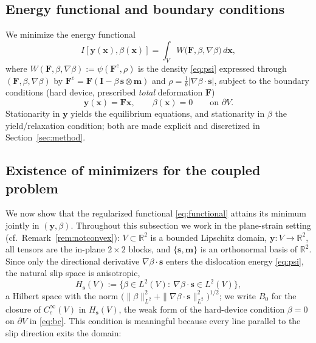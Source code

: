 \documentclass[12pt]{article}
\theoremstyle{plain}
\theoremstyle{definition}
\newcommand{\bF}{\bm{F}}
\newcommand{\bs}{\bm{s}}
\newcommand{\bmm}{\bm{m}}
\newcommand{\by}{\bm{y}}
\newcommand{\bx}{\bm{x}}
\newcommand{\bI}{\bm{I}}
\newcommand{\Fe}{\bF^{e}}
\newcommand{\R}{\mathbb{R}}
\begin{document}
\subsection{Energy functional and boundary conditions}\label{sec:variational}
We minimize the energy functional
\begin{equation}\label{eq:functional}
  I[\by(\bx),\beta(\bx)]=\int_{V} W\bigl(\bF,\beta,\nabla\beta\bigr)\,d\bx ,
\end{equation}
where $W(\bF,\beta,\nabla\beta):=\psi(\Fe,\rho)$ is the density \eqref{eq:psi}
expressed through $(\bF,\beta,\nabla\beta)$ by
$\Fe=\bF(\bI-\beta\,\bs\otimes\bmm)$ and $\rho=\tfrac1b|\nabla\beta\cdot\bs|$,
subject to the boundary conditions (hard device, prescribed \emph{total}
deformation $\bF$)
\begin{equation}\label{eq:bc}
  \by(\bx)=\bF\bx ,\qquad \beta(\bx)=0
  \qquad\text{on }\partial V .
\end{equation}
Stationarity in $\by$ yields the equilibrium equations, and stationarity in
$\beta$ the yield/relaxation condition; both are made explicit and discretized in
Section~\ref{sec:method}.

\subsection{Existence of minimizers for the coupled problem}\label{sec:existence}

We now show that the regularized functional \eqref{eq:functional} attains its
minimum jointly in $(\by,\beta)$. Throughout this subsection we work in the
plane-strain setting (cf.\ Remark~\ref{rem:notconvex}): $V\subset\R^{2}$ is a
bounded Lipschitz domain, $\by\colon V\to\R^{2}$, all tensors are the in-plane
$2\times2$ blocks, and $\{\bs,\bmm\}$ is an orthonormal basis of $\R^{2}$.
Since only the directional derivative $\nabla\beta\cdot\bs$ enters the
dislocation energy \eqref{eq:psi}, the natural slip space is anisotropic,
\begin{equation}\label{eq:Hs}
  H_{\bs}(V):=\bigl\{\beta\in L^{2}(V):\ \nabla\beta\cdot\bs\in L^{2}(V)\bigr\},
\end{equation}
a Hilbert space with the norm
$\bigl(\|\beta\|_{L^{2}}^{2}+\|\nabla\beta\cdot\bs\|_{L^{2}}^{2}\bigr)^{1/2}$;
we write $B_{0}$ for the closure of $C_{c}^{\infty}(V)$ in $H_{\bs}(V)$, the
weak form of the hard-device condition $\beta=0$ on $\partial V$ in
\eqref{eq:bc}. This condition is meaningful because every line parallel to the
slip direction exits the domain:
\end{document}
